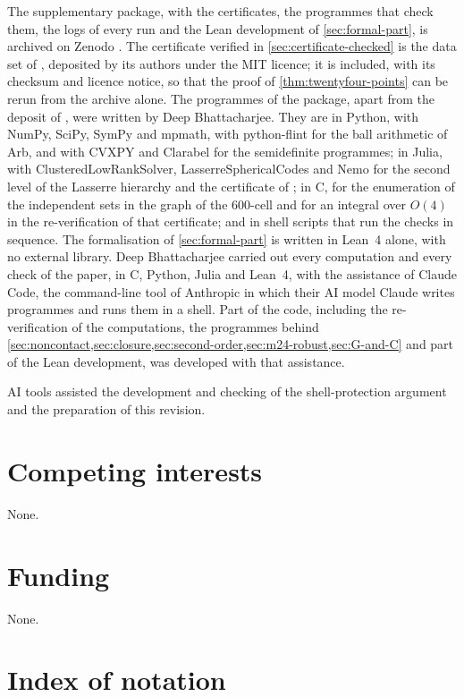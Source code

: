 \documentclass[11pt,reqno]{amsart}
\renewcommand{\_}{\origunderscore\allowbreak}
\numberwithin{equation}{section}
\theoremstyle{plain}
\theoremstyle{definition}
\theoremstyle{remark}
\begin{document}
The supplementary package, with the certificates, the programmes that
check them, the logs of every run and the Lean development of
\cref{sec:formal-part}, is archived on Zenodo
\cite{D4Zenodo}. The certificate verified in \cref{sec:certificate-checked}
is the data set of \cite{LLM24data}, deposited by its authors under the MIT
licence; it is included, with its checksum and licence notice, so that the
proof of \cref{thm:twentyfour-points} can be rerun from the archive alone.
The programmes of the package, apart from the deposit of \cite{LLM24data},
were written by Deep Bhattacharjee. They are in Python, with NumPy,
SciPy, SymPy and mpmath, with python-flint for the ball arithmetic of Arb,
and with CVXPY and Clarabel for the semidefinite programmes; in Julia, with
ClusteredLowRankSolver, LasserreSphericalCodes and Nemo for the second
level of the Lasserre hierarchy and the certificate of \cite{LLM24data};
in C, for the enumeration of the independent sets in the graph of the
600-cell and for an integral over $O(4)$ in the re-verification of that
certificate; and in shell scripts that run the checks in sequence. The
formalisation of \cref{sec:formal-part} is written in Lean~4 alone, with no
external library. Deep Bhattacharjee carried out every computation and
every check of the paper, in C, Python, Julia and Lean~4, with the
assistance of Claude Code, the command-line tool of Anthropic in which
their AI model Claude writes programmes and runs them in a shell. Part of
the code, including the re-verification of the computations, the
programmes behind
\cref{sec:noncontact,sec:closure,sec:second-order,sec:m24-robust,sec:G-and-C}
and part of the Lean development, was developed with that assistance.

AI tools assisted the development and checking of the shell-protection
argument and the preparation of this revision.

\section*{Competing interests}

None.

\section*{Funding}

None.

\appendix
\section{Index of notation}\label{app:notation}
\end{document}
